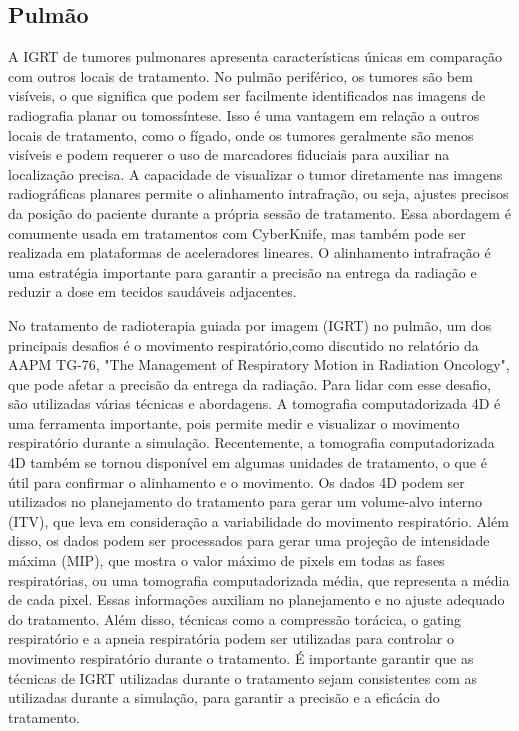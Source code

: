 \documentclass[11pt,a4paper]{article}
\begin{document}
\subsection*{Pulmão}

	A IGRT de tumores pulmonares apresenta características únicas em comparação com outros locais de tratamento. No pulmão periférico, os tumores são bem visíveis, o que significa que podem ser facilmente identificados nas imagens de radiografia planar ou tomossíntese. Isso é uma vantagem em relação a outros locais de tratamento, como o fígado, onde os tumores geralmente são menos visíveis e podem requerer o uso de marcadores fiduciais para auxiliar na localização precisa. A capacidade de visualizar o tumor diretamente nas imagens radiográficas planares permite o alinhamento intrafração, ou seja, ajustes precisos da posição do paciente durante a própria sessão de tratamento. Essa abordagem é comumente usada em tratamentos com CyberKnife, mas também pode ser realizada em plataformas de aceleradores lineares. O alinhamento intrafração é uma estratégia importante para garantir a precisão na entrega da radiação e reduzir a dose em tecidos saudáveis adjacentes.

	No tratamento de radioterapia guiada por imagem (IGRT) no pulmão, um dos principais desafios é o movimento respiratório,como discutido no relatório da AAPM TG-76, "The Management of Respiratory Motion in Radiation Oncology", que pode afetar a precisão da entrega da radiação. Para lidar com esse desafio, são utilizadas várias técnicas e abordagens. A tomografia computadorizada 4D é uma ferramenta importante, pois permite medir e visualizar o movimento respiratório durante a simulação. Recentemente, a tomografia computadorizada 4D também se tornou disponível em algumas unidades de tratamento, o que é útil para confirmar o alinhamento e o movimento. Os dados 4D podem ser utilizados no planejamento do tratamento para gerar um volume-alvo interno (ITV), que leva em consideração a variabilidade do movimento respiratório. Além disso, os dados podem ser processados para gerar uma projeção de intensidade máxima (MIP), que mostra o valor máximo de pixels em todas as fases respiratórias, ou uma tomografia computadorizada média, que representa a média de cada pixel. Essas informações auxiliam no planejamento e no ajuste adequado do tratamento. Além disso, técnicas como a compressão torácica, o gating respiratório e a apneia respiratória podem ser utilizadas para controlar o movimento respiratório durante o tratamento. É importante garantir que as técnicas de IGRT utilizadas durante o tratamento sejam consistentes com as utilizadas durante a simulação, para garantir a precisão e a eficácia do tratamento.
\end{document}
